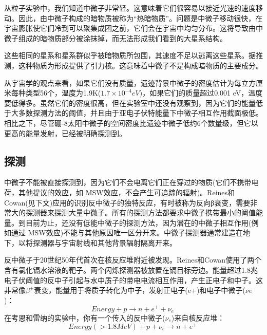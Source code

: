 从粒子实验中，我们知道中微子非常轻。这意味着它们很容易以接近光速的速度移动。因此，由中微子构成的暗物质被称为“热暗物质”。问题是中微子移动很快，在宇宙膨胀使它们冷到可以聚集成团之前，它们会在宇宙中均匀分布。这将导致由中微子组成的暗物质部分被涂抹掉，而无法形成我们看到的大星系结构。

这些相同的星系和星系群似乎被暗物质所包围，其速度不足以逃离这些星系。据推测，这种物质为形成提供了引力核。这意味着中微子不是构成暗物质的主要成分。

从宇宙学的观点来看，如果它们没有质量，遗迹背景中微子的密度估计为每立方厘米每种类型56个，温度为1.9K($1.7\times10^{-4}eV$)，如果它们的质量超过0.001 eV，温度要低得多。虽然它们的密度很高，但在实验室中还没有观察到，因为它们的能量低于大多数探测方法的阈值，并且由于亚电子伏特能量下中微子相互作用截面极低。相比之下，尽管硼-8太阳中微子的空间密度比遗迹中微子低约6个数量级，但它以更高的能量发射，已经被明确探测到。

\subsection{探测}
中微子不能被直接探测到，因为它们不会电离它们正在穿过的物质(它们不携带电荷，其他提议的效应，如 MSW效应，不会产生可追踪的辐射)。Reines和Cowan(见下文)应用的识别反中微子的独特反应，有时被称为反向β衰变，需要非常大的探测器来探测大量中微子。所有的探测方法都要求中微子携带最小的阈值能量。到目前为止，还没有低能中微子的探测方法，因为潜在的中微子相互作用(例如通过 MSW效应)不能与其他原因唯一区分开来。中微子探测器通常建造在地下，以将探测器与宇宙射线和其他背景辐射隔离开来。

反中微子于20世纪50年代首次在核反应堆附近被发现。Reines和Cowan使用了两个含有氯化镉水溶液的靶子。两个闪烁探测器被放置在镉目标旁边。能量超过1.8兆电子伏阈值的反中子引起与水中质子的带电电流相互作用，产生正电子和中子。这非常像$\beta^+$衰变，能量用于将质子转化为中子，发射正电子(e+)和电子中微子($\nu e$ )：
$$Energy+p \to n+e^+ +\nu_e~$$
在考恩和雷纳的实验中，你有一个传入的反中微子($\nu_e$)来自核反应堆：
$$Energy(>1.8 MeV)+p+\nu_e\to n+e^+~$$